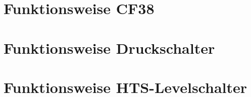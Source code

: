 \section{Funktionsweise CF38}

\section{Funktionsweise Druckschalter}

\section{Funktionsweise HTS-Levelschalter}